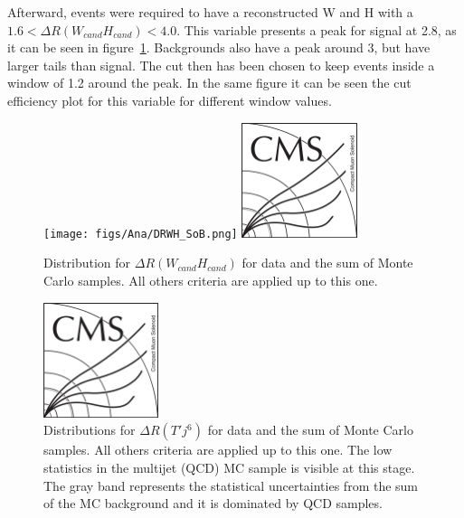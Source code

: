 Afterward, events were required to have a reconstructed W and H with a $1.6<\Delta R (W_{cand} H_{cand})<4.0$. This variable presents a peak for signal at 2.8, as it can be seen in figure~\ref{fig:DRWH}. Backgrounds also have a peak around 3, but have larger tails than signal. The cut then has been chosen to keep events inside a window of 1.2 around the peak. In the same figure it can be seen the cut efficiency plot for this variable for different window values.

\begin{figure}[!Hhtbp]
  \begin{center}
    \texttt{[image: figs/Ana/DRWH\_SoB.png]}
    \includegraphics[width=0.3\textwidth]{figs/CMSlogo.png}
    \caption{Distribution for $\Delta R (W_{cand} H_{cand})$ for data and the sum of Monte Carlo samples. All others criteria are applied up to this one.}
    \label{fig:DRWH}
  \end{center}
\end{figure}\clearpage

\begin{figure}[!Hhtbp]
  \begin{center}
    \includegraphics[width=0.3\textwidth]{figs/CMSlogo.png}
    \caption{Distributions for $ \Delta R (T' j^{6})$  for data and the sum of Monte Carlo samples. All others criteria are applied up to this one. The low statistics in the multijet (QCD) MC sample is visible at this stage. The gray band represents the statistical uncertainties from the sum of the MC background and it is dominated by QCD samples.}
    \label{fig:jet6}
  \end{center}
\end{figure}\clearpage

